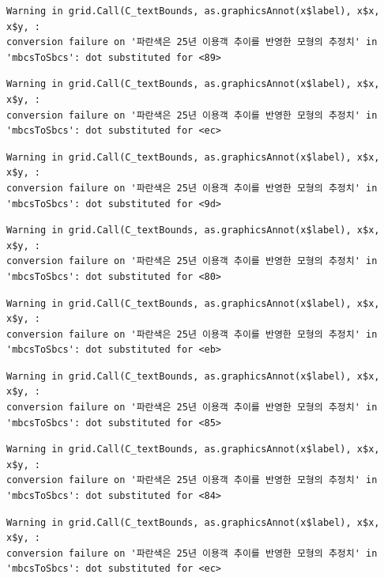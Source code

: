 \documentclass[
  letterpaper,
  DIV=11,
  numbers=noendperiod]{scrreprt}
\begin{document}
\begin{verbatim}
Warning in grid.Call(C_textBounds, as.graphicsAnnot(x$label), x$x, x$y, :
conversion failure on '파란색은 25년 이용객 추이를 반영한 모형의 추정치' in
'mbcsToSbcs': dot substituted for <89>
\end{verbatim}

\begin{verbatim}
Warning in grid.Call(C_textBounds, as.graphicsAnnot(x$label), x$x, x$y, :
conversion failure on '파란색은 25년 이용객 추이를 반영한 모형의 추정치' in
'mbcsToSbcs': dot substituted for <ec>
\end{verbatim}

\begin{verbatim}
Warning in grid.Call(C_textBounds, as.graphicsAnnot(x$label), x$x, x$y, :
conversion failure on '파란색은 25년 이용객 추이를 반영한 모형의 추정치' in
'mbcsToSbcs': dot substituted for <9d>
\end{verbatim}

\begin{verbatim}
Warning in grid.Call(C_textBounds, as.graphicsAnnot(x$label), x$x, x$y, :
conversion failure on '파란색은 25년 이용객 추이를 반영한 모형의 추정치' in
'mbcsToSbcs': dot substituted for <80>
\end{verbatim}

\begin{verbatim}
Warning in grid.Call(C_textBounds, as.graphicsAnnot(x$label), x$x, x$y, :
conversion failure on '파란색은 25년 이용객 추이를 반영한 모형의 추정치' in
'mbcsToSbcs': dot substituted for <eb>
\end{verbatim}

\begin{verbatim}
Warning in grid.Call(C_textBounds, as.graphicsAnnot(x$label), x$x, x$y, :
conversion failure on '파란색은 25년 이용객 추이를 반영한 모형의 추정치' in
'mbcsToSbcs': dot substituted for <85>
\end{verbatim}

\begin{verbatim}
Warning in grid.Call(C_textBounds, as.graphicsAnnot(x$label), x$x, x$y, :
conversion failure on '파란색은 25년 이용객 추이를 반영한 모형의 추정치' in
'mbcsToSbcs': dot substituted for <84>
\end{verbatim}

\begin{verbatim}
Warning in grid.Call(C_textBounds, as.graphicsAnnot(x$label), x$x, x$y, :
conversion failure on '파란색은 25년 이용객 추이를 반영한 모형의 추정치' in
'mbcsToSbcs': dot substituted for <ec>
\end{verbatim}
\end{document}
